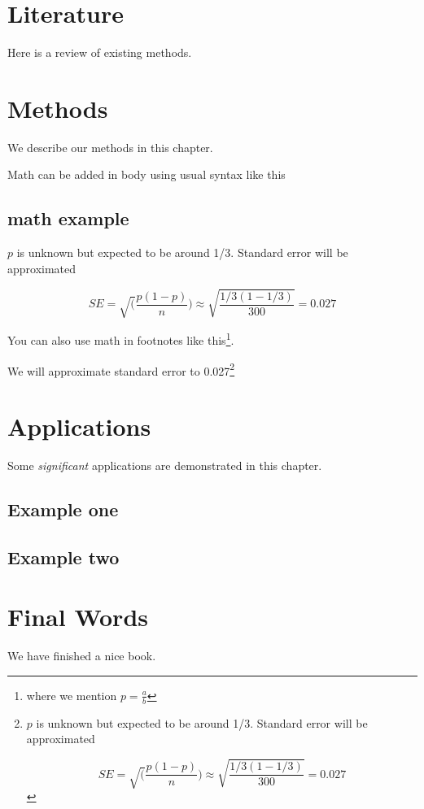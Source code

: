 \documentclass[
]{book}
\begin{document}
\hypertarget{literature}{%
\chapter{Literature}\label{literature}}

Here is a review of existing methods.

\hypertarget{methods}{%
\chapter{Methods}\label{methods}}

We describe our methods in this chapter.

Math can be added in body using usual syntax like this

\hypertarget{math-example}{%
\section{math example}\label{math-example}}

\(p\) is unknown but expected to be around 1/3. Standard error will be approximated

\[
SE = \sqrt(\frac{p(1-p)}{n}) \approx \sqrt{\frac{1/3 (1 - 1/3)} {300}} = 0.027
\]

You can also use math in footnotes like this\footnote{where we mention \(p = \frac{a}{b}\)}.

We will approximate standard error to 0.027\footnote{\(p\) is unknown but expected to be around 1/3. Standard error will be approximated

  \[
  SE = \sqrt(\frac{p(1-p)}{n}) \approx \sqrt{\frac{1/3 (1 - 1/3)} {300}} = 0.027
  \]}

\hypertarget{applications}{%
\chapter{Applications}\label{applications}}

Some \emph{significant} applications are demonstrated in this chapter.

\hypertarget{example-one}{%
\section{Example one}\label{example-one}}

\hypertarget{example-two}{%
\section{Example two}\label{example-two}}

\hypertarget{final-words}{%
\chapter{Final Words}\label{final-words}}

We have finished a nice book.

  
\end{document}
